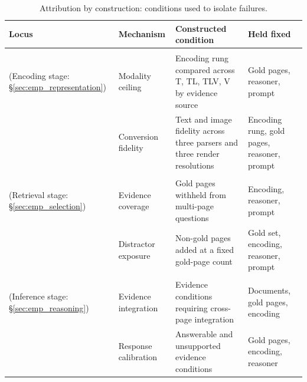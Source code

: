 \begin{table}[h]
\centering
\small
\setlength{\tabcolsep}{4pt}
\renewcommand{\arraystretch}{1.15}
\begin{tabularx}{\linewidth}{@{}
  >{\raggedright\arraybackslash}p{2.3cm}
  l
  >{\raggedright\arraybackslash}X
  >{\raggedright\arraybackslash}X@{}}
\toprule
Locus & Mechanism & Constructed condition & Held fixed \\
\midrule
\multirow{3}{2.3cm}{\textbf{Representation}\\(Encoding stage: \S\ref{sec:emp_representation})}
 & Modality ceiling & Encoding rung compared across T, TL, TLV, V by evidence source & Gold pages, reasoner, prompt \\
\cmidrule(l){2-4}
 & Conversion fidelity & Text and image fidelity across three parsers and three render resolutions & Encoding rung, gold pages, reasoner, prompt \\
\midrule
\multirow{3}{2.3cm}{\textbf{Selection}\\(Retrieval stage: \S\ref{sec:emp_selection})}
 & Evidence coverage & Gold pages withheld from multi-page questions & Encoding, reasoner, prompt \\
\cmidrule(l){2-4}
 & Distractor exposure & Non-gold pages added at a fixed gold-page count & Gold set, encoding, reasoner, prompt \\
\midrule
\multirow{3}{2.3cm}{\textbf{Reasoning}\\(Inference stage: \S\ref{sec:emp_reasoning})}
 & Evidence integration & Evidence conditions requiring cross-page integration & Documents, gold pages, encoding \\
\cmidrule(l){2-4}
 & Response calibration & Answerable and unsupported evidence conditions & Gold pages, encoding, reasoner \\
\bottomrule
\end{tabularx}
\caption{Attribution by construction: conditions used to isolate failures.}
\label{tab:experiments}
\end{table}
